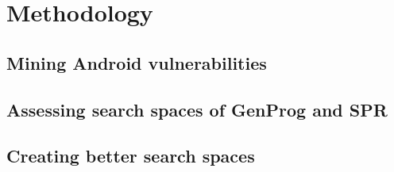 \section{Methodology}
\label{section:methodology}

\subsection{Mining Android vulnerabilities}

\subsection{Assessing search spaces of GenProg and SPR}

\subsection{Creating better search spaces}


